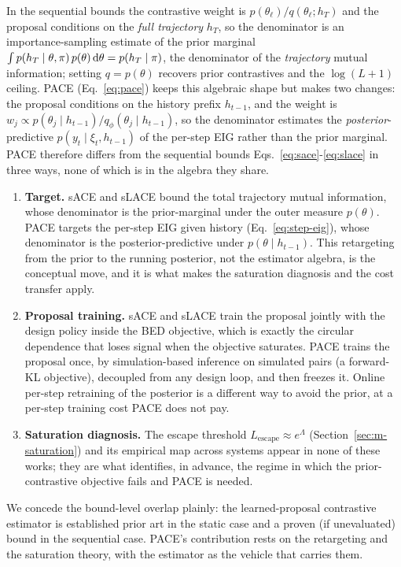 In the sequential bounds the contrastive weight is $p(\theta_\ell)/q(\theta_\ell;h_T)$ and
the proposal conditions on the \emph{full trajectory} $h_T$, so the denominator is an
importance-sampling estimate of the prior marginal
$\int p(h_T\mid\theta,\pi)\,p(\theta)\,\mathrm{d}\theta=p(h_T\mid\pi)$, the denominator of the
\emph{trajectory} mutual information; setting $q=p(\theta)$ recovers prior contrastives and
the $\log(L+1)$ ceiling. PACE (Eq.~\eqref{eq:pace}) keeps this algebraic shape but makes two
changes: the proposal conditions on the history prefix $h_{t-1}$, and the weight is
$w_j\propto p(\theta_j\mid h_{t-1})/q_\phi(\theta_j\mid h_{t-1})$, so the denominator
estimates the \emph{posterior}-predictive $p(y_t\mid\xi_t,h_{t-1})$ of the per-step EIG
rather than the prior marginal. PACE therefore differs from the sequential bounds
Eqs.~\eqref{eq:sace}-\eqref{eq:slace} in three ways, none of which is in the algebra they
share.
\begin{enumerate}[leftmargin=*,itemsep=0.2em]
  \item \textbf{Target.} sACE and sLACE bound the total trajectory mutual information,
  whose denominator is the prior-marginal under the outer measure $p(\theta)$. PACE
  targets the per-step EIG given history (Eq.~\eqref{eq:step-eig}), whose denominator
  is the posterior-predictive under $p(\theta\mid h_{t-1})$. This retargeting from the
  prior to the running posterior, not the estimator algebra, is the conceptual move,
  and it is what makes the saturation diagnosis and the cost transfer apply.
  \item \textbf{Proposal training.} sACE and sLACE train the proposal jointly with the
  design policy inside the BED objective, which is exactly the circular dependence that
  loses signal when the objective saturates. PACE trains the proposal once, by
  simulation-based inference on simulated pairs (a forward-KL objective), decoupled
  from any design loop, and then freezes it. Online per-step retraining of the
  posterior \citep{klein2026supercharging,zaballa2025bridging} is a different way to
  avoid the prior, at a per-step training cost PACE does not pay.
  \item \textbf{Saturation diagnosis.} The escape threshold $L_{\mathrm{escape}}\approx
  e^{\Lambda}$ (Section~\ref{sec:m-saturation}) and its empirical map across systems
  appear in none of these works; they are what identifies, in advance, the regime in
  which the prior-contrastive objective fails and PACE is needed.
\end{enumerate}
We concede the bound-level overlap plainly: the learned-proposal contrastive estimator
is established prior art in the static case and a proven (if unevaluated) bound in the
sequential case. PACE's contribution rests on the retargeting and the saturation
theory, with the estimator as the vehicle that carries them.

